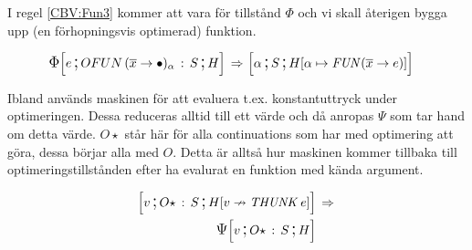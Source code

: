 \documentclass[../Optimise]{subfiles}
\begin{document}
 I regel \eqref{CBV:Fun3} kommer att vara för tillstånd
 $\Phi$ och vi skall återigen bygga upp (en förhopningsvis optimerad) funktion.

\begin{align}
\label{CBV:Fun3} \IRR{\cOFUN{\many{x}}{\alpha}S}He  \rulesep &\, \mc{\alpha}S{\heap{\alpha}{\FUN{\many{x}}e}}
\end{align}

Ibland används maskinen för att evaluera t.ex. konstantuttryck under optimeringen.
Dessa reduceras alltid till ett värde och då anropas $\Psi$ som tar hand 
om detta värde. $O\star$ står här för alla continuations som har med optimering
att göra, dessa börjar alla med $O$. Detta är alltså hur maskinen kommer 
tillbaka till optimeringstillstånden efter ha evalurat en funktion med 
kända argument.

\begin{align}
\mc v{O\star\,:\, S}{\nheap v{\THUNK e}} & \rulesep\\
\PSI{O\star\,:\, S}Hv \nonumber
\end{align}

%
%
%
%
%
\end{document}
